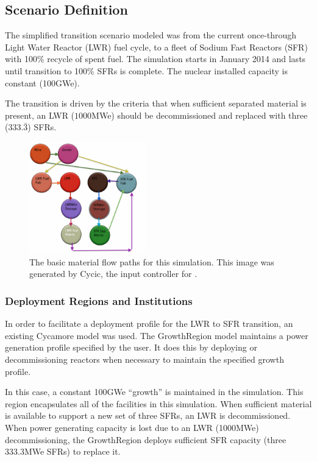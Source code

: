 \subsection{Scenario Definition}
The simplified transition scenario modeled was from the current once-through
Light Water Reactor (LWR) fuel cycle, to a fleet of Sodium Fast Reactors (SFR)
with 100\% recycle of spent fuel.  The simulation starts in January 2014 and
lasts until transition to 100\% SFRs is complete. The nuclear installed
capacity is constant (100GWe).

The transition is driven by the criteria that when sufficient separated
material is present, an LWR ($1000$MWe) should be decommissioned and replaced
with three ($333.\bar{3}$) SFRs.

\begin{figure}[htpb!]
\begin{center}
\includegraphics[width=0.45\textwidth]{cycic_img.eps}
\end{center}
\caption{The basic material flow paths for this simulation. This image was 
generated by Cycic, the input controller for \Cyclus 
\cite{flanagan_input_2013}.}
\label{fig:cycic_img}
\end{figure}

\subsubsection{Deployment Regions and Institutions}

In order to facilitate a deployment profile for the LWR to SFR transition, an 
existing Cycamore model was used. The GrowthRegion model maintains a 
power generation profile specified by the user. It does this by deploying or 
decommissioning reactors when necessary to maintain the specified growth 
profile.  

In this case, a constant 100GWe ``growth'' is maintained in the simulation. 
This region encapsulates all of the facilities in this simulation. 
When sufficient material is available to support a new set of three SFRs, an 
LWR is decommissioned. When power generating capacity is lost due to an LWR 
(1000MWe) decommissioning, the GrowthRegion deploys sufficient SFR capacity 
(three 333.3MWe SFRs) to replace it. 

